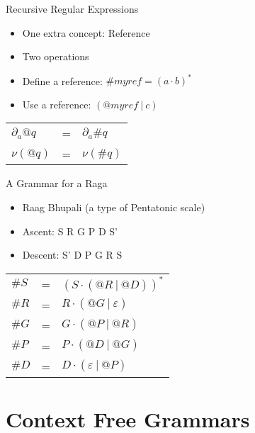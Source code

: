 \documentclass[10pt]{beamer}
\begin{document}
\begin{frame}{Recursive Regular Expressions}
\begin{itemize}
\item One extra concept: Reference
\item Two operations
\item Define a reference: $\#myref = (a \cdot b)^{*}$
\item Use a reference: $(@myref\ |\ c)$
\end{itemize}
\begin{center}
\begin{tabular}{l c l}
$\partial_a @q$ & = & $\partial_a \#q$ \\
$\nu(@q)$ & = & $\nu(\#q)$ \\
\end{tabular}
\end{center}
\end{frame}

\begin{frame}{A Grammar for a Raga}
\begin{itemize}
\item Raag Bhupali (a type of Pentatonic scale)
\item Ascent: S R G P D S'
\item Descent: S' D P G R S
\end{itemize}
\begin{center}
\begin{tabular}{lll}
$\#S$ & = & $(S \cdot ( @R\ |\ @D ))^{*}$ \\
$\#R$ & = & $R \cdot ( @G\ |\ \varepsilon )$ \\
$\#G$ & = & $G \cdot ( @P\ |\ @R )$ \\
$\#P$ & = & $P \cdot ( @D\ |\ @G )$ \\
$\#D$ & = & $D \cdot ( \varepsilon\ |\ @P )$ \\
\end{tabular}
\end{center}
\end{frame}


\section{Context Free Grammars}
\end{document}
